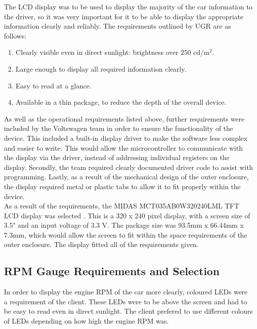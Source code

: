 \documentclass[a4paper,12pt]{article}
\begin{document}
The LCD display was to be used to display the majority of the car information to the driver, so it was very important for it to be able to display the appropriate information clearly and reliably. The requirements outlined by UGR are as follows:

\begin{enumerate}
  \item Clearly visible even in direct sunlight: brightness over 250 cd/$\textrm{m}^2$.
  \item Large enough to display all required information clearly.
  \item Easy to read at a glance.
  \item Available in a thin package, to reduce the depth of the overall device.
\end{enumerate}

As well as the operational requirements listed above, further requirements were included by the Voltswagen team in order to ensure the functionality of the device. This included a built-in display driver to make the software less complex and easier to write. This would allow the microcontroller to communicate with the display via the driver, instead of addressing individual registers on the display. Secondly, the team required clearly documented driver code to assist with programming. Lastly, as a result of the mechanical design of the outer enclosure, the display required metal or plastic tabs to allow it to fit properly within the device. \\

As a result of the requirements, the MIDAS MCT035AB0W320240LML TFT LCD display was selected \cite{display_datasheet}. This is a 320 x 240 pixel display, with a screen size of 3.5" and an input voltage of 3.3 V. The package size was 93.5mm x 66.44mm x 7.3mm, which would allow the screen to fit within the space requirements of the outer enclosure. The display fitted all of the requirements given.

\subsection{RPM Gauge Requirements and Selection}
\label{sec:LEDs}

In order to display the engine RPM of the car more clearly, coloured LEDs were a requirement of the client. These LEDs were to be above the screen and had to be easy to read even in direct sunlight. The client prefered to use different colours of LEDs depending on how high the engine RPM was. \\
\end{document}

